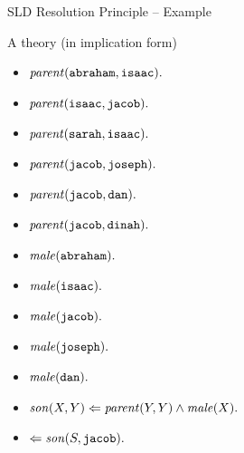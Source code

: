 \documentclass[presentation]{beamer}\mode<presentation>{\usetheme{AMSBolognaFC}}
\begin{document}
\begin{frame}[allowframebreaks]{SLD Resolution Principle -- Example}
    \begin{block}{A theory (in implication form)}
        \begin{multicols}{2}
            \begin{itemize}
                \item $\text{\textit{parent}}(\mathtt{abraham}, \mathtt{isaac}) \mathtt{.}$
                \item $\text{\textit{parent}}(\mathtt{isaac}, \mathtt{jacob}) \mathtt{.}$
                \item $\text{\textit{parent}}(\mathtt{sarah}, \mathtt{isaac}) \mathtt{.}$
                \item $\text{\textit{parent}}(\mathtt{jacob}, \mathtt{joseph}) \mathtt{.}$
                \item $\text{\textit{parent}}(\mathtt{jacob}, \mathtt{dan}) \mathtt{.}$
                \item $\text{\textit{parent}}(\mathtt{jacob}, \mathtt{dinah}) \mathtt{.}$
                \item $\text{\textit{male}}(\mathtt{abraham}) \mathtt{.}$
                \item $\text{\textit{male}}(\mathtt{isaac}) \mathtt{.}$
                \item $\text{\textit{male}}(\mathtt{jacob}) \mathtt{.}$
                \item $\text{\textit{male}}(\mathtt{joseph}) \mathtt{.}$
                \item $\text{\textit{male}}(\mathtt{dan}) \mathtt{.}$
            \end{itemize}
        \end{multicols}
        \begin{itemize}
            \item $\text{\textit{son}}(X, Y) \Leftarrow \text{\textit{parent}}(Y, Y) \wedge \text{\textit{male}}(X) \mathtt{.}$
            \item $\Leftarrow \text{\textit{son}}(S, \mathtt{jacob}) \mathtt{.}$
        \end{itemize}
    \end{block}
\end{frame}
\end{document}
